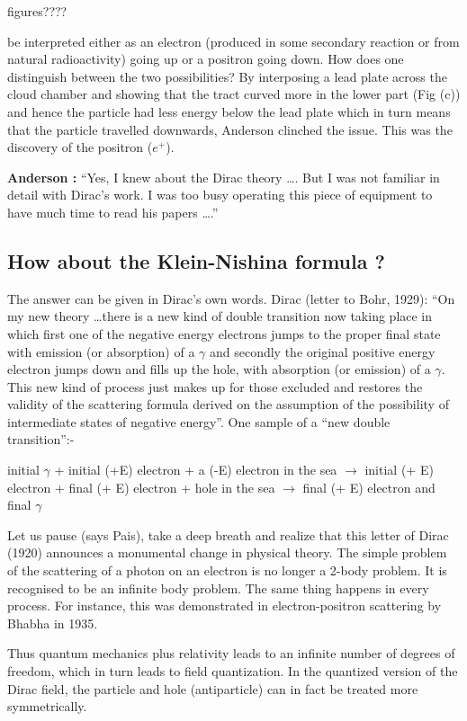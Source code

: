 figures????

be interpreted either as an electron (produced in some secondary reaction or from natural radioactivity) going up or a positron going down. How does one  distinguish between the two possibilities? By interposing a lead plate across the cloud chamber and showing that the tract curved more in the lower part (Fig (c)) and hence the particle had less energy below the lead plate which in turn means that the particle travelled downwards, Anderson clinched the issue. This was the discovery of the positron ($e^{+}$).


\textbf{Anderson :}	“Yes, I knew about the Dirac theory …. But I was not familiar in detail with Dirac’s work. I was too busy operating this piece of equipment to have much time to read his papers ….”

\subsection*{How about the Klein-Nishina formula ?}

The answer can be given in Dirac’s own words. Dirac (letter to Bohr, 1929): “On my new theory …there is a new kind of double transition now taking place in which first one of the negative energy electrons jumps to the proper final state with emission (or absorption) of a $\gamma$ and secondly the original positive energy electron jumps down and fills up the hole, with absorption (or emission) of a $\gamma$. This new kind of process just makes up for those excluded and restores the validity of the scattering formula derived on the assumption of the possibility of intermediate states of negative energy”. One sample of a “new double transition”:- 
\begin{center}
	initial $\gamma$ + initial (+E) electron + a (-E) electron in the sea
	$\rightarrow$ initial (+ E) electron + final (+ E) electron + hole in the sea
			$\rightarrow$ final (+ E) electron and final $\gamma$
\end{center}
	Let us pause (says Pais), take a deep breath and realize that this letter of Dirac (1920) announces a monumental change in physical theory. The simple problem of the scattering of a photon on an electron is no longer a 2-body problem. It is recognised to be an infinite body problem. The same thing happens in every process. For instance, this was demonstrated in electron-positron scattering by Bhabha in 1935.

	Thus quantum mechanics plus relativity leads to an infinite number of degrees of freedom, which in turn leads to field quantization. In the quantized version of the Dirac field, the particle and hole (antiparticle) can in fact be treated more symmetrically.

